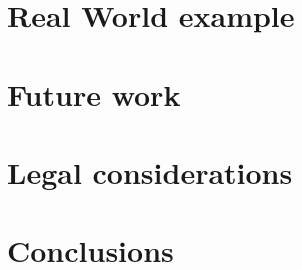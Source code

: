 \documentclass[11pt,a4paper,titlepage]{article}
\begin{document}
    \section{Real World example}
    \section{Future work}
    \section{Legal considerations}
    
    \section{Conclusions}
    
    
	\newpage
    
	
    
    
\end{document}
